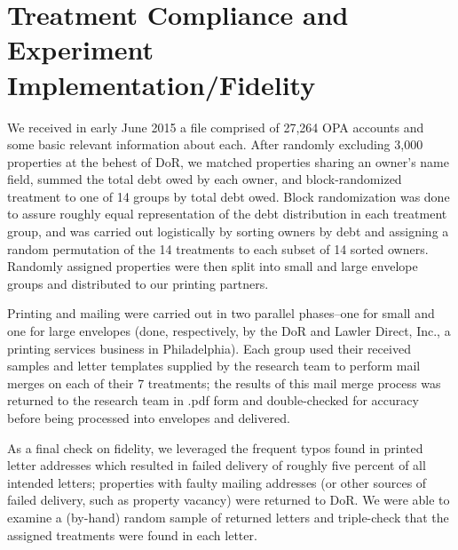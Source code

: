 

\part*{Treatment Compliance and Experiment Implementation/Fidelity}

We received in early June 2015 a file comprised of 27,264 OPA accounts
and some basic relevant information about each. After randomly excluding
3,000 properties at the behest of DoR, we matched properties sharing
an owner's name field, summed the total debt owed by each owner, and
block-randomized treatment to one of 14 groups by total debt owed.
Block randomization was done to assure roughly equal representation
of the debt distribution in each treatment group, and was carried
out logistically by sorting owners by debt and assigning a random
permutation of the 14 treatments to each subset of 14 sorted owners.
Randomly assigned properties were then split into small and large
envelope groups and distributed to our printing partners.

Printing and mailing were carried out in two parallel phases--one
for small and one for large envelopes (done, respectively, by the
DoR and Lawler Direct, Inc., a printing services business in Philadelphia).
Each group used their received samples and letter templates supplied
by the research team to perform mail merges on each of their 7 treatments;
the results of this mail merge process was returned to the research
team in .pdf form and double-checked for accuracy before being processed
into envelopes and delivered.

As a final check on fidelity, we leveraged the frequent typos found
in printed letter addresses which resulted in failed delivery of roughly
five percent of all intended letters; properties with faulty mailing
addresses (or other sources of failed delivery, such as property vacancy)
were returned to DoR. We were able to examine a (by-hand) random sample
of returned letters and triple-check that the assigned treatments
were found in each letter.

